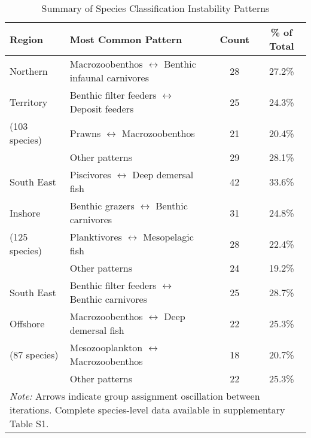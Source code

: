 \begin{table}[htbp]
\centering
\caption{Summary of Species Classification Instability Patterns}
\label{tab:unstable_species}
\small
\begin{tabular}{llcc}
\hline
Region & Most Common Pattern & Count & \% of Total \\
\hline
Northern & Macrozoobenthos $\leftrightarrow$ Benthic infaunal carnivores & 28 & 27.2\% \\
Territory & Benthic filter feeders $\leftrightarrow$ Deposit feeders & 25 & 24.3\% \\
(103 species) & Prawns $\leftrightarrow$ Macrozoobenthos & 21 & 20.4\% \\
& Other patterns & 29 & 28.1\% \\
\hline
South East & Piscivores $\leftrightarrow$ Deep demersal fish & 42 & 33.6\% \\
Inshore & Benthic grazers $\leftrightarrow$ Benthic carnivores & 31 & 24.8\% \\
(125 species) & Planktivores $\leftrightarrow$ Mesopelagic fish & 28 & 22.4\% \\
& Other patterns & 24 & 19.2\% \\
\hline
South East & Benthic filter feeders $\leftrightarrow$ Benthic carnivores & 25 & 28.7\% \\
Offshore & Macrozoobenthos $\leftrightarrow$ Deep demersal fish & 22 & 25.3\% \\
(87 species) & Mesozooplankton $\leftrightarrow$ Macrozoobenthos & 18 & 20.7\% \\
& Other patterns & 22 & 25.3\% \\
\hline
\multicolumn{4}{p{0.95\textwidth}}{\small \textit{Note:} Arrows indicate group assignment oscillation between iterations. Complete species-level data available in supplementary Table S1.} \\
\hline
\end{tabular}
\end{table}
